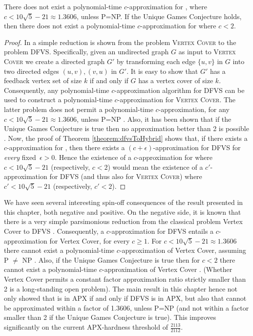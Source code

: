 \begin{corollary}
There does not exist a polynomial-time $c$-approximation for \mh, where
$c < 10\sqrt{5}-21 \approx 1.3606$, unless P=NP. If the Unique Games Conjecture
holds, then there does not exist a polynomial-time $c$-approximation for \mh where
$c < 2$.
\end{corollary}
\begin{proof}
In \cite{karp1972} a simple reduction is shown from the problem \textsc{Vertex Cover}
to the problem {\sc DFVS}. Specifically, given an undirected graph $G$ as input to \textsc{Vertex Cover} we create a directed graph $G'$ by transforming each edge $\{u,v\}$ in $G$ into two directed edges
$(u,v), (v,u)$ in $G'$. It is easy to show that $G'$ has a feedback vertex set of size
$k$ if and only if $G$ has a vertex cover of size $k$. Consequently, any polynomial-time
$c$-approximation algorithm for DFVS can be used to construct a polynomial-time
$c$-approximation for \textsc{Vertex Cover}. The latter problem does not permit a polynomial-time $c$-approximation, for any $c < 10\sqrt{5}-21 \approx 1.3606$, unless P=NP \cite{dinur,DinurAnnals}.
Also, it has been shown that if the Unique Games Conjecture is true then no approximation better than 2 is possible \cite{Khot2008}. Now, the proof of Theorem \ref{theorem:dfvsToHybrid} shows that, if there exists a $c$-approximation for \mh, then there exists a $(c+\epsilon)$-approximation for DFVS for \emph{every} fixed~$\epsilon > 0$. Hence the existence of a $c$-approximation for \mh where $c < 10\sqrt{5}-21$ (respectively, $c < 2$) would mean the existence of a $c'$-approximation for DFVS (and thus also for \textsc{Vertex Cover}) where $c' <  10\sqrt{5}-21$ (respectively, $c' < 2$).
\end{proof}




We have seen several interesting spin-off consequences of the result presented in this chapter, both negative and positive. On the negative side, it is known that there is a very simple parsimonious reduction from the classical problem {\sc Vertex Cover} to DFVS \cite{karp1972}. Consequently, a $c$-approximation for DFVS entails a $c$-approximation for {\sc Vertex Cover}, for every $c \geq 1$. For $c < 10\sqrt{5}-21 \approx 1.3606$ there cannot exist a polynomial-time $c$-approximation of {\sc Vertex Cover}, assuming P $\neq$ NP \cite{dinur,DinurAnnals}. Also, if the Unique Games Conjecture is true then for $c < 2$ there cannot exist a polynomial-time $c$-approximation of {\sc Vertex Cover} \cite{Khot2008}. (Whether {\sc Vertex Cover} permits a constant factor approximation ratio strictly smaller than 2 is a long-standing open problem). The main result in this chapter hence not only showed that \mh is in APX if and only if DFVS is in APX, but also that \mh cannot be approximated within a factor of 1.3606, unless P=NP (and not within a factor smaller than 2 if the Unique Games Conjecture is true). This improves significantly on the current APX-hardness threshold of $\frac{2113}{2112}$.

